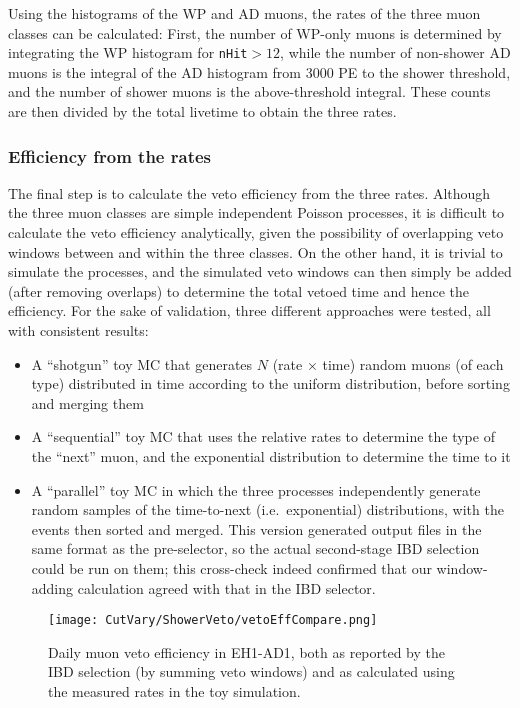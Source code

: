 \documentclass[../thesis.tex]{subfiles}
\begin{document}
Using the histograms of the WP and AD muons, the rates of the three muon classes can be calculated: First, the number of WP-only muons is determined by integrating the WP histogram for \texttt{nHit}$> 12$, while the number of non-shower AD muons is the integral of the AD histogram from 3000 PE to the shower threshold, and the number of shower muons is the above-threshold integral. These counts are then divided by the total livetime to obtain the three rates.

\subsubsection{Efficiency from the rates}
\label{sec:cutVaryMuVetoEffFromRates}

The final step is to calculate the veto efficiency from the three rates. Although the three muon classes are simple independent Poisson processes, it is difficult to calculate the veto efficiency analytically, given the possibility of overlapping veto windows between and within the three classes. On the other hand, it is trivial to simulate the processes, and the simulated veto windows can then simply be added (after removing overlaps) to determine the total vetoed time and hence the efficiency. For the sake of validation, three different approaches were tested, all with consistent results:

\begin{itemize}
\item A ``shotgun'' toy MC that generates $N$ (rate $\times$ time) random muons (of each type) distributed in time according to the uniform distribution, before sorting and merging them
\item A ``sequential'' toy MC that uses the relative rates to determine the type of the ``next'' muon, and the exponential distribution to determine the time to it
\item A ``parallel'' toy MC in which the three processes independently generate random samples of the time-to-next (i.e.\ exponential) distributions, with the events then sorted and merged. This version generated output files in the same format as the pre-selector, so the actual second-stage IBD selection could be run on them; this cross-check indeed confirmed that our window-adding calculation agreed with that in the IBD selector.
\end{itemize}

\begin{figure}[ht]
  \texttt{[image: CutVary/ShowerVeto/vetoEffCompare.png]}
  \caption{Daily muon veto efficiency in EH1-AD1, both as reported by the IBD selection (by summing veto windows) and as calculated using the measured rates in the toy simulation.}
  \label{fig:cutVaryVetoEffCompare}
\end{figure}
\end{document}
